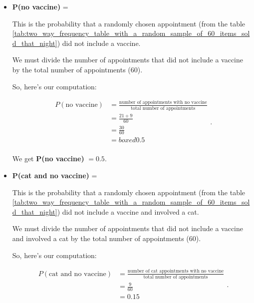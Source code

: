 \begin{itemize}
  \label{item:two_way_frequency_table}

  \item \textbf{P(no vaccine)} = \boxed{ }

    This is the probability that a randomly chosen appointment (from the table
    \ref{tab:two_way_frequency_table_with_a_random_sample_of_60_items_sold_that_night})
    did not include a vaccine.

    We must divide the number of appointments that did not include a vaccine by
    the total number of appointments ($60$).

    So, here's our computation:

    \begin{equation}
      \label{eqt:no_vaccine}
      \begin{split}
        P(\textrm{no vaccine}) &= \frac{\textrm{number of appointments with no
          vaccine}}{\textrm{total number of appointments}} \\
                               &= \frac{21 + 9}{60} \\
                               &= \frac{30}{60} \\
                               &= boxed{0.5} \\
      \end{split}
    .\end{equation}

    We get \textbf{P(no vaccine)} $= 0.5$.

  \item \textbf{P(cat and no vaccine)} = \boxed{ }

    This is the probability that a randomly chosen appointment (from the table
    \ref{tab:two_way_frequency_table_with_a_random_sample_of_60_items_sold_that_night})
    did not include a vaccine and involved a cat.

    We must divide the number of appointments that did not include a vaccine and
    involved a cat by the total number of appointments ($60$).

    So, here's our computation:
    
    \begin{equation}
      \label{eqt:cat_and_no_vaccine}
      \begin{split}
        P( \textrm{cat and no vaccine}) &= \frac{\textrm{number of cat
          appointments with no vaccine}}{\textrm{total number of appointments}} \\
                                        &= \frac{9}{60} \\
                                        &= \boxed{0.15} \\
      \end{split}
    .\end{equation}


\end{itemize}
